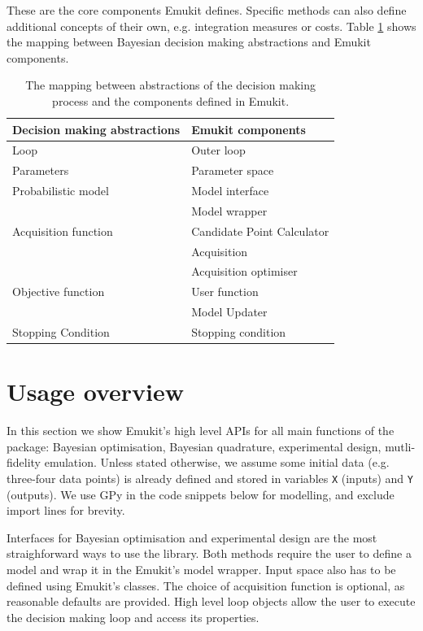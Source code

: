 These are the core components Emukit defines. Specific methods can also define additional concepts of their own, e.g. integration measures or costs. Table \ref{table:abstraction_mapping} shows the mapping between Bayesian decision making abstractions and Emukit components.

\begin{table}
    \setlength{\DUtablewidth}{\tablewidth}
    \begin{longtable}[c]{p{0.4\DUtablewidth}p{0.4\DUtablewidth}}
        \toprule
        \textbf{Decision making abstractions} & \textbf{Emukit components} \\
        \midrule
        \endfirsthead
        Loop & Outer loop \\
        \midrule
        Parameters & Parameter space \\
        Probabilistic model & Model interface \\
        & Model wrapper \\
        \midrule
        Acquisition function & Candidate Point Calculator \\
        & Acquisition \\
        & Acquisition optimiser \\
        \midrule
        Objective function & User function \\
        & Model Updater \\
        \midrule
        Stopping Condition & Stopping condition \\
        \bottomrule
    \end{longtable}
    \caption{The mapping between abstractions of the decision making process and the components defined in Emukit.}
    \label{table:abstraction_mapping}
\end{table}

\section{Usage overview}
In this section we show Emukit's high level APIs for all main functions of the package: Bayesian optimisation, Bayesian quadrature, experimental design, mutli-fidelity emulation. Unless stated otherwise, we assume some initial data (e.g. three-four data points) is already defined and stored in variables \texttt{X} (inputs) and \texttt{Y} (outputs). We use GPy \cite{gpy2014} in the code snippets below for modelling, and exclude import lines for brevity.

Interfaces for Bayesian optimisation and experimental design are the most straighforward ways to use the library. Both methods require the user to define a model and wrap it in the Emukit's model wrapper. Input space also has to be defined using Emukit's classes. The choice of acquisition function is optional, as reasonable defaults are provided. High level loop objects allow the user to execute the decision making loop and access its properties.

